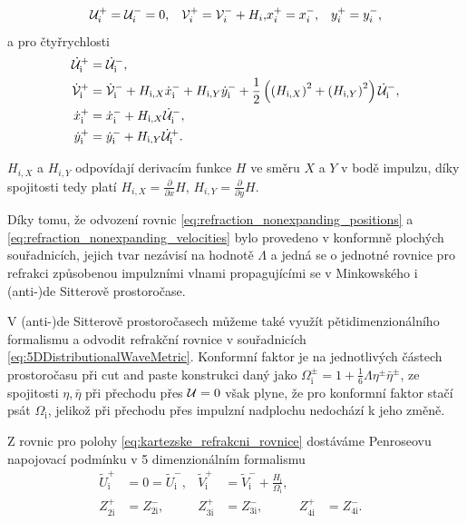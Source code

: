 \begin{align}
    \label{eq:kartezske_refrakcni_rovnice}
        \mathcal{U}_i^{+} &= \mathcal{U}_i^{-} = 0, & 
        \mathcal{V}_i^{+} = \mathcal{V}_i^{-} + H_i, &
        x_i^{+} = x_i^{-}, & 
        y_i^{+} = y_i^{-},
\end{align}
a pro čtyřrychlosti
\begin{equation}
    \label{eq:refraction_velocity_null_cart}
    \begin{split}
        \dot {\mathcal{U}}_{\mathrm{i}}^{+} &= \dot {\mathcal{U}}_{\mathrm{i}}^{-}, \\
        \dot {\mathcal{V}}_{\mathrm{i}}^{+} &= \dot {\mathcal{V}}_{\mathrm{i}}^{-} + H_{\mathrm{i}, X} \dot x_{\mathrm{i}}^{-} + H_{\mathrm{i}, Y} \dot y_{\mathrm{i}}^{-} + \frac{1}{2}\left(\left(H_{\mathrm{i}, X}\right)^2 + \left(H_{\mathrm{i}, Y}\right)^2\right) \dot {\mathcal{U}}_{\mathrm{i}}^{-}, \\
        \dot x_{\mathrm{i}}^{+} &= \dot x_{\mathrm{i}}^{-} + H_{\mathrm{i}, X} \dot {\mathcal{U}}_{\mathrm{i}}^{-}, \\
        \dot y_{\mathrm{i}}^{+} &= \dot y_{\mathrm{i}}^{-} + H_{\mathrm{i}, Y} \dot {\mathcal{U}}_{\mathrm{i}}^{+}.
    \end{split}
\end{equation}

$H_{i,X}$ a $H_{i, Y}$ odpovídají derivacím funkce $H$ ve směru $X$ a $Y$ v bodě impulzu, díky spojitosti tedy platí
$H_{i,X} = \frac{\partial}{\partial x} H$, $H_{i,Y} = \frac{\partial}{\partial y} H$.

Díky tomu, že odvození rovnic \eqref{eq:refraction_nonexpanding_positions} a \eqref{eq:refraction_nonexpanding_velocities} bylo provedeno v konformně plochých souřadnicích,
jejich tvar nezávisí na hodnotě $\Lambda$ a jedná se o jednotné rovnice pro refrakci způsobenou impulzními vlnami propagujícími se v
Minkowského i (anti-)de Sitterově prostoročase.

V (anti-)de Sitterově prostoročasech můžeme také využít pětidimenzionálního formalismu a odvodit refrakční rovnice v souřadnicích \eqref{eq:5DDistributionalWaveMetric}.
Konformní faktor je na jednotlivých částech prostoročasu při cut and paste konstrukci daný jako $\Omega^{\pm}_{\mathrm{i}} = 1 + \frac{1}{6} \Lambda \eta^{\pm} \bar{\eta}^{\pm}$,
ze spojitosti $\eta, \bar{\eta}$ při přechodu přes $\mathcal{U}=0$
však plyne, že pro konformní faktor stačí psát $\Omega_{\mathrm{i}}$, jelikož při přechodu přes impulzní nadplochu nedochází k jeho změně.

Z rovnic pro polohy \eqref{eq:kartezske_refrakcni_rovnice} dostáváme Penroseovu napojovací podmínku v 5 dimenzionálním formalismu
\begin{align}
        \tilde{U}^{+}_\mathrm{i} &= 0 = \tilde{U}^{-}_\mathrm{i}, &
        \tilde{V}^{+}_\mathrm{i} &= \tilde{V}^{-}_\mathrm{i} + \frac{H_\mathrm{i}}{\Omega_\mathrm{i}}, \nonumber \\
        Z^{+}_{2\mathrm{i}} &= Z^{-}_{2\mathrm{i}}, &
        Z^{+}_{3\mathrm{i}} &= Z^{-}_{3\mathrm{i}}, &
        Z^{+}_{4\mathrm{i}} &= Z^{-}_{4\mathrm{i}}.  &
\end{align}

